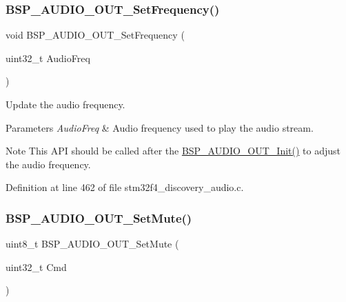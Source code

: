 \subsubsection{\texorpdfstring{B\+S\+P\+\_\+\+A\+U\+D\+I\+O\+\_\+\+O\+U\+T\+\_\+\+Set\+Frequency()}{BSP\_AUDIO\_OUT\_SetFrequency()}}
{\footnotesize\ttfamily void B\+S\+P\+\_\+\+A\+U\+D\+I\+O\+\_\+\+O\+U\+T\+\_\+\+Set\+Frequency (\begin{DoxyParamCaption}\item[{uint32\+\_\+t}]{Audio\+Freq }\end{DoxyParamCaption})}



Update the audio frequency. 


\begin{DoxyParams}{Parameters}
{\em Audio\+Freq} & Audio frequency used to play the audio stream. \\
\hline
\end{DoxyParams}
\begin{DoxyNote}{Note}
This A\+PI should be called after the \mbox{\hyperlink{group___s_t_m32_f4___d_i_s_c_o_v_e_r_y___a_u_d_i_o___o_u_t___private___functions_gae713c698a93ff492424c6a8363f53bcc}{B\+S\+P\+\_\+\+A\+U\+D\+I\+O\+\_\+\+O\+U\+T\+\_\+\+Init()}} to adjust the audio frequency. 
\end{DoxyNote}


Definition at line 462 of file stm32f4\+\_\+discovery\+\_\+audio.\+c.

\mbox{\label{group___s_t_m32_f4___d_i_s_c_o_v_e_r_y___a_u_d_i_o___o_u_t___private___functions_ga6f0fdfb8396ba31eaebb8ff530de3dd3}} 
\subsubsection{\texorpdfstring{B\+S\+P\+\_\+\+A\+U\+D\+I\+O\+\_\+\+O\+U\+T\+\_\+\+Set\+Mute()}{BSP\_AUDIO\_OUT\_SetMute()}}
{\footnotesize\ttfamily uint8\+\_\+t B\+S\+P\+\_\+\+A\+U\+D\+I\+O\+\_\+\+O\+U\+T\+\_\+\+Set\+Mute (\begin{DoxyParamCaption}\item[{uint32\+\_\+t}]{Cmd }\end{DoxyParamCaption})}



